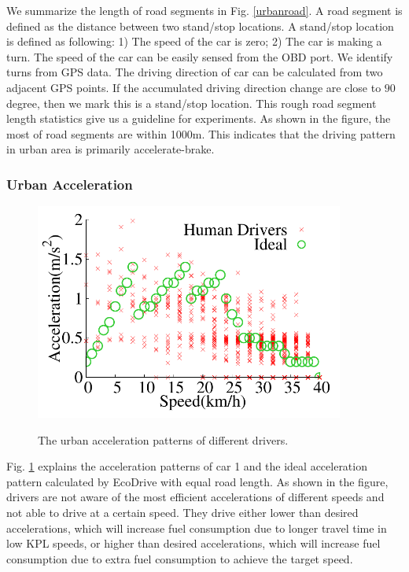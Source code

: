We summarize the length of road segments in Fig. \ref{urbanroad}.
A road segment is defined as the distance between two stand/stop locations. 
A stand/stop location is defined as following: 
1) The speed of the car is zero; 2) The car is making a turn. 
The speed of the car can be easily sensed from the OBD port. 
We identify turns from GPS data. 
The driving direction of car can be calculated from two adjacent GPS points. 
If the accumulated driving direction change are close to $90$ degree, 
then we mark this is a stand/stop location. 
This rough road segment length statistics give us a 
guideline for experiments. 
As shown in the figure, the most of road segments are within 1000m.
This indicates that the driving pattern in urban area is primarily  
accelerate-brake. 


\subsubsection{Urban Acceleration}



\begin{figure}[ht]
\begin{center}
\includegraphics[width=4.0in,angle=0]{Figs/EcoDrive/evaluation/real_opt_acce_single.pdf}
\vspace{-0.0cm}
\caption{The urban acceleration patterns of different drivers.}
\vspace{-0.5cm}
\label{urbanaccelerations}
\end{center}
\end{figure}

Fig. \ref{urbanaccelerations} explains the acceleration patterns of
car 1 and the ideal acceleration pattern calculated by EcoDrive
with equal road length. 
As shown in the figure, drivers are not aware of the most efficient
accelerations of different speeds and not able to drive at a certain speed. 
They drive either lower than
desired accelerations, which will increase fuel consumption
due to longer travel time in low KPL speeds, 
or higher than desired accelerations, 
which will increase fuel consumption due to extra fuel consumption
to achieve the target speed. 



